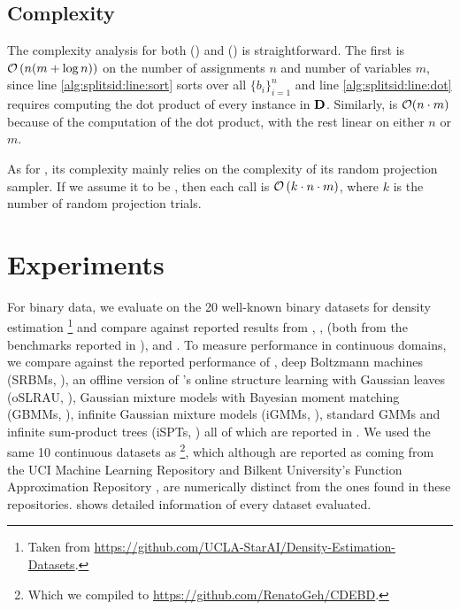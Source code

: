 \subsection{Complexity}

The complexity analysis for both  () and 
() is straightforward. The first is $\mathcal{O}\left(n(m+\log n)\right)$ on the
number of assignments $n$ and number of variables $m$, since line \ref{alg:splitsid:line:sort}
sorts over all $\{b_i\}_{i=1}^n$ and line \ref{alg:splitsid:line:dot} requires computing the dot
product of every instance in $\mathbf{D}$. Similarly,  is $\mathcal{O}(n\cdot m)$ because
of the computation of the dot product, with the rest linear on either $n$ or $m$.

As for , its complexity mainly relies on the complexity of its random projection
sampler. If we assume it to be , then each  call is
$\mathcal{O}\left(k\cdot n\cdot m\right)$, where $k$ is the number of random projection trials.

\section{Experiments}

For binary data, we evaluate  on the 20 well-known binary datasets for density
estimation \citep{lowd10,haaren12}\footnote{Taken from
\url{https://github.com/UCLA-StarAI/Density-Estimation-Datasets}.} and compare against reported
results from  \citep{gens13}, ,  (both
from the benchmarks reported in \cite{dang20}),  \citep{jaini18a} and
 \citep{dimauro21}. To measure performance in continuous domains, we compare
 against the reported performance of , deep Boltzmann
machines (SRBMs, \cite{salakhutdinov09}), an offline version of \citeauthor{hsu17}'s online
structure learning with Gaussian leaves (oSLRAU, \cite{hsu17}), Gaussian mixture models with
Bayesian moment matching (GBMMs, \cite{jaini16}), infinite Gaussian mixture models (iGMMs,
\cite{rasmussen00}), standard GMMs and infinite sum-product trees (iSPTs, \cite{trapp16}) all of
which are reported in \citet{jaini18a}. We used the same 10 continuous datasets as
\citet{jaini18a}\footnote{Which we compiled to \url{https://github.com/RenatoGeh/CDEBD}.}, which
although are reported as coming from the UCI Machine Learning Repository \citep{dua17} and Bilkent
University's Function Approximation Repository \citep{guvenir00}, are numerically distinct from the
ones found in these repositories.  shows detailed information of every dataset
evaluated.

